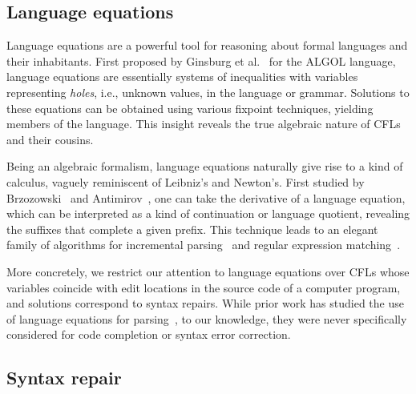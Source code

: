 \documentclass[sigplan,review,acmsmall,nonacm,screen,anonymous]{acmart}\settopmatter{printfolios=false,printccs=false,printacmref=false}
\begin{document}
\subsection{Language equations}

Language equations are a powerful tool for reasoning about formal languages and their inhabitants. First proposed by Ginsburg et al.~\cite{ginsburg1962two} for the ALGOL language, language equations are essentially systems of inequalities with variables representing \textit{holes}, i.e., unknown values, in the language or grammar. Solutions to these equations can be obtained using various fixpoint techniques, yielding members of the language. This insight reveals the true algebraic nature of CFLs and their cousins.

Being an algebraic formalism, language equations naturally give rise to a kind of calculus, vaguely reminiscent of Leibniz's and Newton's. First studied by Brzozowski~\cite{brzozowski1964derivatives, brzozowski1980equations} and Antimirov~\cite{antimirov1996partial}, one can take the derivative of a language equation, which can be interpreted as a kind of continuation or language quotient, revealing the suffixes that complete a given prefix. This technique leads to an elegant family of algorithms for incremental parsing~\cite{might2011parsing, adams2016complexity} and regular expression matching~\cite{stanford2021symbolic,varatalu2025re}.


More concretely, we restrict our attention to language equations over CFLs whose variables coincide with edit locations in the source code of a computer program, and solutions correspond to syntax repairs. While prior work has studied the use of language equations for parsing~\cite{might2011parsing}, to our knowledge, they were never specifically considered for code completion or syntax error correction.

\subsection{Syntax repair}
\end{document}
